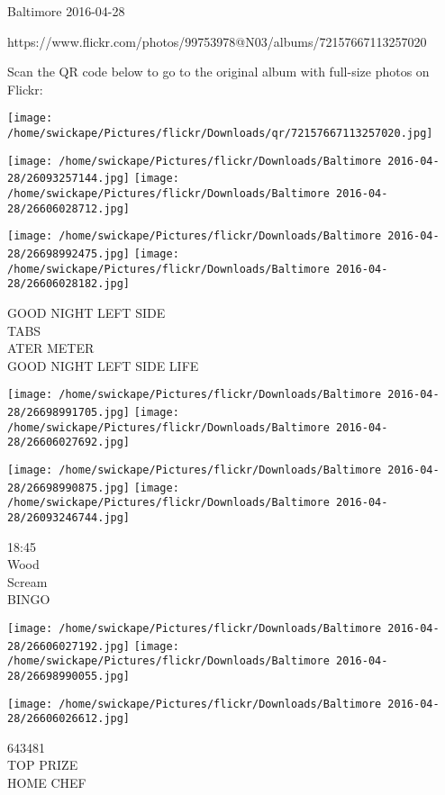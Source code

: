 \documentclass[10pt,letterpaper]{article}
\begin{document}
Baltimore 2016-04-28

https://www.flickr.com/photos/99753978@N03/albums/72157667113257020

Scan the QR code below to go to the original album with full-size photos on Flickr:

\texttt{[image: /home/swickape/Pictures/flickr/Downloads/qr/72157667113257020.jpg]}
\pagebreak

\texttt{[image: /home/swickape/Pictures/flickr/Downloads/Baltimore 2016-04-28/26093257144.jpg]}
\texttt{[image: /home/swickape/Pictures/flickr/Downloads/Baltimore 2016-04-28/26606028712.jpg]}

\texttt{[image: /home/swickape/Pictures/flickr/Downloads/Baltimore 2016-04-28/26698992475.jpg]}
\texttt{[image: /home/swickape/Pictures/flickr/Downloads/Baltimore 2016-04-28/26606028182.jpg]}

GOOD NIGHT LEFT SIDE\\
TABS\\
ATER METER\\
GOOD NIGHT LEFT SIDE LIFE\\
\pagebreak

\texttt{[image: /home/swickape/Pictures/flickr/Downloads/Baltimore 2016-04-28/26698991705.jpg]}
\texttt{[image: /home/swickape/Pictures/flickr/Downloads/Baltimore 2016-04-28/26606027692.jpg]}

\texttt{[image: /home/swickape/Pictures/flickr/Downloads/Baltimore 2016-04-28/26698990875.jpg]}
\texttt{[image: /home/swickape/Pictures/flickr/Downloads/Baltimore 2016-04-28/26093246744.jpg]}

18:45\\
Wood\\
Scream\\
BINGO\\
\pagebreak

\texttt{[image: /home/swickape/Pictures/flickr/Downloads/Baltimore 2016-04-28/26606027192.jpg]}
\texttt{[image: /home/swickape/Pictures/flickr/Downloads/Baltimore 2016-04-28/26698990055.jpg]}

\texttt{[image: /home/swickape/Pictures/flickr/Downloads/Baltimore 2016-04-28/26606026612.jpg]}

643481\\
TOP PRIZE\\
HOME CHEF\\
\pagebreak
\end{document}

